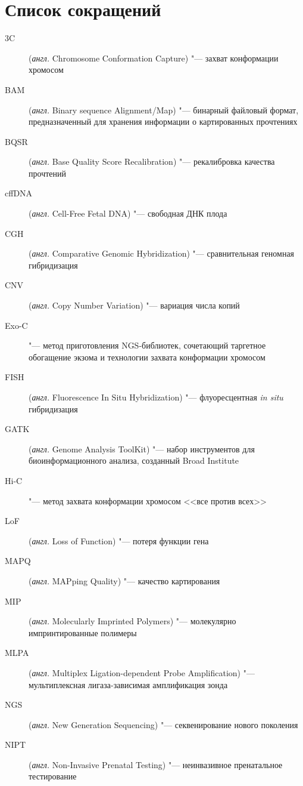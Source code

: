 \documentclass[a4paper,12pt]{article}
\begin{document}
\tableofcontents

\newpage

\section*{Список сокращений}

\begin{description}
\item[3C] (\textit{англ.} Chromosome Conformation Capture) "--- захват конформации хромосом
\item[BAM] (\textit{англ.} Binary sequence Alignment/Map) "--- бинарный файловый формат, предназначенный для хранения информации о картированных прочтениях
\item[BQSR] (\textit{англ.} Base Quality Score Recalibration) "--- рекалибровка качества прочтений
\item[cffDNA] (\textit{англ.} Cell-Free Fetal DNA) "--- свободная ДНК плода
\item[CGH] (\textit{англ.} Comparative Genomic Hybridization) "--- сравнительная геномная гибридизация
\item[CNV] (\textit{англ.} Copy Number Variation) "--- вариация числа копий
\item[Exo-C] "--- метод приготовления NGS-библиотек, сочетающий таргетное обогащение экзома и технологии захвата конформации хромосом
\item[FISH] (\textit{англ.} Fluorescence In Situ Hybridization) "--- флуоресцентная \textit{in situ} гибридизация
\item[GATK] (\textit{англ.} Genome Analysis ToolKit) "--- набор инструментов для биоинформационного анализа, созданный Broad Institute
\item[Hi-C] "--- метод захвата конформации хромосом <<все против всех>>
\item[LoF] (\textit{англ.} Loss of Function) "--- потеря функции гена
\item[MAPQ] (\textit{англ.} MAPping Quality) "--- качество картирования
\item[MIP] (\textit{англ.} Molecularly Imprinted Polymers) "--- молекулярно импринтированные полимеры
\item[MLPA] (\textit{англ.} Multiplex Ligation-dependent Probe Amplification) "--- мультиплексная лигаза-зависимая амплификация зонда
\item[NGS] (\textit{англ.} New Generation Sequencing) "--- секвенирование нового поколения
\item[NIPT] (\textit{англ.} Non-Invasive Prenatal Testing) "--- неинвазивное пренатальное тестирование

\end{description}
\end{document}
